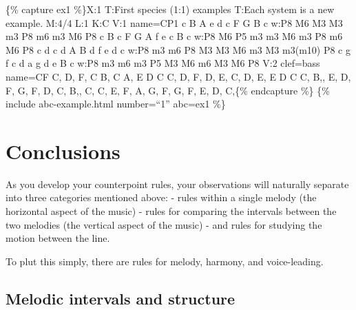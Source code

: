 \documentclass{book}
\begin{document}
\{\% capture ex1 \%\}X:1 T:First species (1:1) examples T:Each system is a new
example. M:4/4 L:1 K:C V:1 name=CP1 c\textbar{} B\textbar{} A\textbar{}
e\textbar{} d\textbar{} c\textbar{} F\textbar{} G\textbar{} B\textbar{}
c\textbar{]} w:P8 M6 M3 M3 m3 P8 m6 m3 M6 P8 c\textbar{} B\textbar{}
c\textbar{} F\textbar{} G\textbar{} A\textbar{} f\textbar{} e\textbar{}
c\textbar{} B\textbar{} c\textbar{]} w:P8 M6 P5 m3 m3 M6 m3 P8 m6 M6 P8
c\textbar{} d\textbar{} c\textbar{} d\textbar{} A\textbar{} B\textbar{}
d\textbar{} f\textbar{} e\textbar{} d\textbar{} c\textbar{]} w:P8 m3 m6 P8 M3
M3 M6 m3 M3 m3(m10) P8 c\textbar{} g\textbar{} f\textbar{} c\textbar{}
d\textbar{} a\textbar{} g\textbar{} d\textbar{} e\textbar{} B\textbar{}
c\textbar{]} w:P8 m3 m6 m3 P5 M3 M6 m6 M3 M6 P8 V:2 clef=bass name=CF
C,\textbar{} D,\textbar{} F,\textbar{} C\textbar{} B,\textbar{} C\textbar{}
A,\textbar{} E\textbar{} D\textbar{} C\textbar{]} C,\textbar{} D,\textbar{}
F,\textbar{} D,\textbar{} E,\textbar{} C,\textbar{} D,\textbar{} E,\textbar{}
E\textbar{} D\textbar{} C\textbar{]} C,\textbar{} B,,\textbar{} E,\textbar{}
D,\textbar{} F,\textbar{} G,\textbar{} F,\textbar{} D,\textbar{} C,\textbar{}
B,,\textbar{} C,\textbar{]} C,\textbar{} E,\textbar{} F,\textbar{}
A,\textbar{} G,\textbar{} F,\textbar{} G,\textbar{} F,\textbar{} E,\textbar{}
D,\textbar{} C,\textbar{]}\{\% endcapture \%\} \{\% include abc-example.html
number=``1'' abc=ex1 \%\}

\hypertarget{conclusions-27}{%
\section{Conclusions}\label{conclusions-27}}

As you develop your counterpoint rules, your observations will naturally
separate into three categories mentioned above: - rules within a single melody
(the horizontal aspect of the music) - rules for comparing the intervals
between the two melodies (the vertical aspect of the music) - and rules for
studying the motion between the line.

To plut this simply, there are rules for melody, harmony, and voice-leading.

\hypertarget{melodic-intervals-and-structure}{%
\subsection{Melodic intervals and
structure}\label{melodic-intervals-and-structure}}
\end{document}
